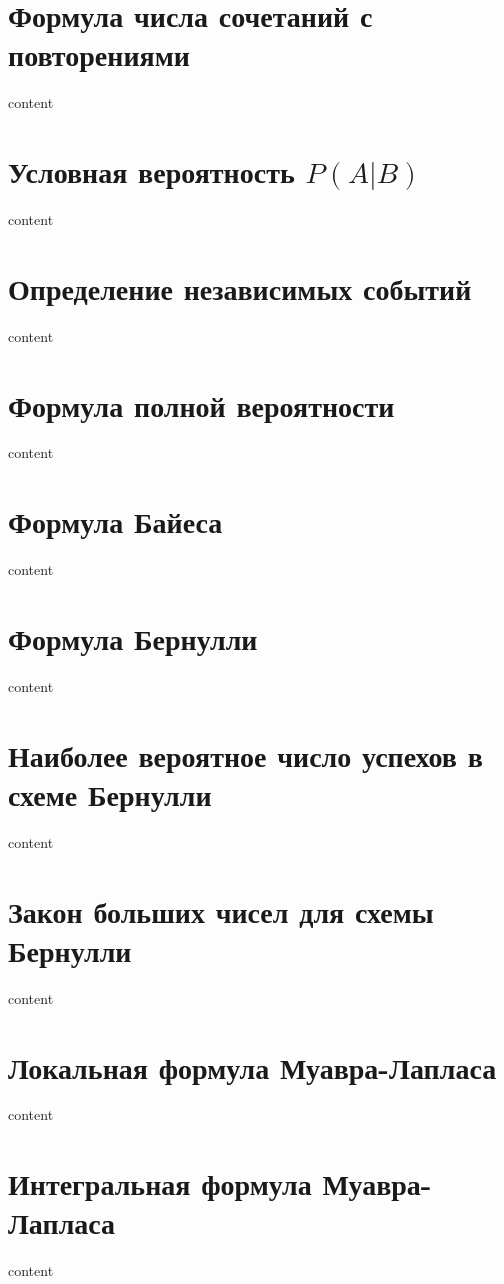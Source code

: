 \section{Формула числа сочетаний с повторениями}

content

\section{Условная вероятность $P(A | B)$}

content

\section{Определение независимых событий}

content

\section{Формула полной вероятности}

content

\section{Формула Байеса}

content

\section{Формула Бернулли}

content

\section{Наиболее вероятное число успехов в схеме Бернулли}

content

\section{Закон больших чисел для схемы Бернулли}

content

\section{Локальная формула Муавра-Лапласа}

content

\section{Интегральная формула Муавра-Лапласа}

content

